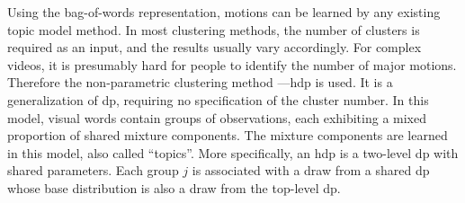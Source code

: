 Using the bag-of-words representation, motions can be learned by any existing topic model method. 
In most clustering methods, the number of clusters is required as an input, and the results usually vary accordingly. For complex videos, it is presumably hard for people to identify the number of major motions. Therefore the non-parametric clustering method ---\gls{hdp} is used. 
It is a generalization of \gls{dp}, requiring no specification of the cluster number. 
In this model, visual words contain groups of observations, each exhibiting a mixed proportion of shared mixture components. 
The mixture components are learned in this model, also called ``topics''. 
More specifically, an \gls{hdp} is a two-level \gls{dp} with shared parameters. Each group $j$ is associated with a draw from a shared \gls{dp} whose base distribution is also a draw from the top-level \gls{dp}.
